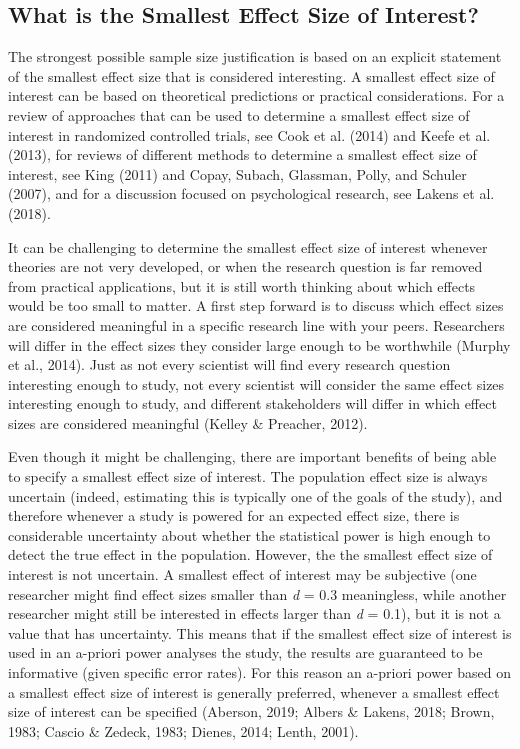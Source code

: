 \documentclass[
  english,
  ,jou, a4paper,floatsintext]{apa6}
\begin{document}
\hypertarget{what-is-the-smallest-effect-size-of-interest}{%
\subsection{What is the Smallest Effect Size of Interest?}\label{what-is-the-smallest-effect-size-of-interest}}

The strongest possible sample size justification is based on an explicit statement of the smallest effect size that is considered interesting. A smallest effect size of interest can be based on theoretical predictions or practical considerations. For a review of approaches that can be used to determine a smallest effect size of interest in randomized controlled trials, see Cook et al. (2014) and Keefe et al. (2013), for reviews of different methods to determine a smallest effect size of interest, see King (2011) and Copay, Subach, Glassman, Polly, and Schuler (2007), and for a discussion focused on psychological research, see Lakens et al. (2018).

It can be challenging to determine the smallest effect size of interest whenever theories are not very developed, or when the research question is far removed from practical applications, but it is still worth thinking about which effects would be too small to matter. A first step forward is to discuss which effect sizes are considered meaningful in a specific research line with your peers. Researchers will differ in the effect sizes they consider large enough to be worthwhile (Murphy et al., 2014). Just as not every scientist will find every research question interesting enough to study, not every scientist will consider the same effect sizes interesting enough to study, and different stakeholders will differ in which effect sizes are considered meaningful (Kelley \& Preacher, 2012).

Even though it might be challenging, there are important benefits of being able to specify a smallest effect size of interest. The population effect size is always uncertain (indeed, estimating this is typically one of the goals of the study), and therefore whenever a study is powered for an expected effect size, there is considerable uncertainty about whether the statistical power is high enough to detect the true effect in the population. However, the the smallest effect size of interest is not uncertain. A smallest effect of interest may be subjective (one researcher might find effect sizes smaller than \emph{d} = 0.3 meaningless, while another researcher might still be interested in effects larger than \emph{d} = 0.1), but it is not a value that has uncertainty. This means that if the smallest effect size of interest is used in an a-priori power analyses the study, the results are guaranteed to be informative (given specific error rates). For this reason an a-priori power based on a smallest effect size of interest is generally preferred, whenever a smallest effect size of interest can be specified (Aberson, 2019; Albers \& Lakens, 2018; Brown, 1983; Cascio \& Zedeck, 1983; Dienes, 2014; Lenth, 2001).
\end{document}
